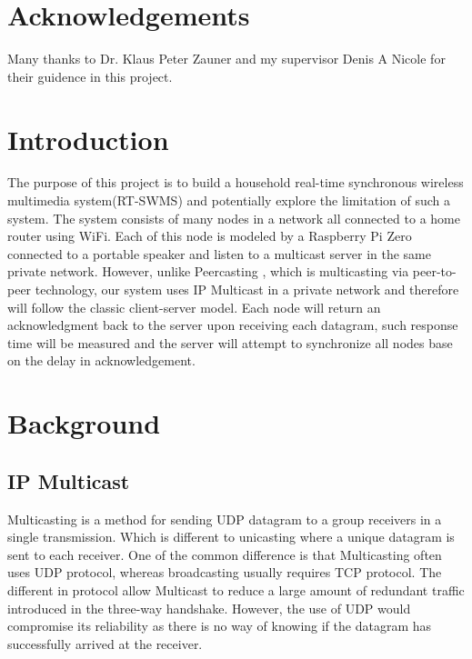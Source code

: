 \documentclass[12pt]{article}
\begin{document}
\pagebreak

\tableofcontents
\pagebreak

\section*{Acknowledgements}
Many thanks to Dr. Klaus Peter Zauner and my supervisor Denis A Nicole for their guidence in this project.
\pagebreak



\section{Introduction}
The purpose of this project is to build a household real-time synchronous wireless multimedia system(RT-SWMS) and potentially explore the limitation of such a system. The system consists of many nodes in a network all connected to a home router using WiFi. Each of this node is modeled by a Raspberry Pi Zero connected to a portable speaker and listen to a multicast server in the same private network. However, unlike Peercasting \cite{Peercasting:1}, which is multicasting via peer-to-peer technology, our system uses IP Multicast in a private network and therefore will follow the classic client-server model. Each node will return an acknowledgment back to the server upon receiving each datagram, such response time will be measured and the server will attempt to synchronize all nodes base on the delay in acknowledgement.


\section{Background}

\subsection{IP Multicast}

Multicasting is a method for sending UDP datagram to a group receivers in a single transmission. Which is different to unicasting where a unique datagram is sent to each receiver. One of the common difference is that Multicasting often uses UDP protocol, whereas broadcasting usually requires TCP protocol. The different in protocol allow Multicast to reduce a large amount of redundant traffic introduced in the three-way handshake. However, the use of UDP would compromise its reliability as there is no way of knowing if the datagram has successfully arrived at the receiver.
\end{document}
